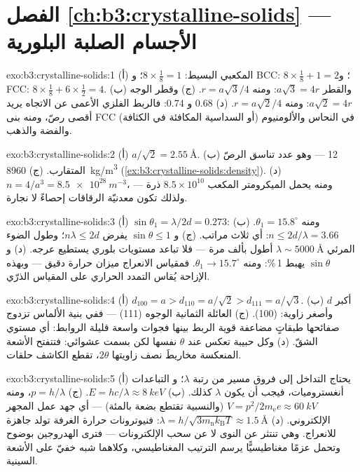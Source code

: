 \section*{الفصل \ref{ch:b3:crystalline-solids} --- الأجسام الصلبة البلورية}

\begin{solution}{exo:b3:crystalline-solids:1}
(أ) المكعبي البسيط: $8\times\tfrac18 = 1$؛ و BCC: $8\times\tfrac18 + 1 = 2$؛
و FCC: $8\times\tfrac18 + 6\times\tfrac12 = 4$. (ب) والقطر
$a\sqrt3 = 4r$: ومنه $r = a\sqrt3/4$. (ج) وقطر الوجه $a\sqrt2 = 4r$:
ومنه $r = a\sqrt2/4$. (د) $0.68$ و $0.74$: فالربط الفلزي
الأعمى عن الاتجاه يريد أقصى رصّ، ومنه بنى FCC (أو السداسية
المكافئة في الكثافة) في النحاس والألومنيوم والفضة والذهب.
\end{solution}

\begin{solution}{exo:b3:crystalline-solids:2}
(أ) $a/\sqrt2 = \qty{2.55}{\angstrom}$. (ب) 12 --- وهو عدد تناسق
الرصّ المتقارب. (ج) \qty{8960}{kg/m^3}
(\cref{ex:b3:crystalline-solids:density}). (د) $n = 4/a^3 =
\qty{8.5e28}{m^{-3}}$، ومنه يحمل الميكرومتر المكعب
$8.5\times10^{10}$ ذرة --- ولذلك تكون معدنيّة الرقاقات
إحصاءً لا نجارة.
\end{solution}

\begin{solution}{exo:b3:crystalline-solids:3}
(أ) $\sin\theta_1 = \lambda/2d = 0.273$: ومنه $\theta_1 =
15.8^\circ$. (ب) $n \le 2d/\lambda = 3.66$: أي ثلاث مراتب. (ج)
و $\sin\theta \le 1$ يفرض $n\lambda \le 2d$؛ وطول الضوء المرئي
$\lambda \sim \qty{5000}{\angstrom}$ أطول بألف مرة
--- فلا تباعد مستويات بلوري يستطيع عرجه. (د) و $\sin\theta$
يهبط 1\,\%: ومنه $\theta_1 \to 15.7^\circ$. فمقياس الانعراج ميزان
حرارة دقيق --- وبهذه الإزاحة يُقاس التمدد الحراري
على المقياس الذرّي.
\end{solution}

\begin{solution}{exo:b3:crystalline-solids:4}
(أ) $d_{100} = a > d_{110} = a/\sqrt2 > d_{111} = a/\sqrt3$. (ب)
أكبر $d$ وأصغر زاوية: (100). (ج) العائلة الثمانية الوجوه (111)
--- ففي بنية الألماس تزدوج صفائحها طبقاتٍ مضاعفة قوية
الربط بينها فجوات واسعة قليلة الروابط:
أي مستوي الشقّ. (د) وكل حبيبة تعكس عند $\theta$ نفسها
لكن بسمت عشوائي: فتتفتح الأشعة المنعكسة مخاريطَ
نصف زاويتها $2\theta$، تقطع الكاشف حلقات.
\end{solution}

\begin{solution}{exo:b3:crystalline-solids:5}
(أ) يحتاج التداخل إلى فروق مسير من رتبة $\lambda$؛ و
التباعدات أنغستروميات، فيجب أن يكون $\lambda$ كذلك. (ب) $E =
hc/\lambda \approx \qty{8}{keV}$. (ج) $p = h/\lambda$، ومنه $V =
p^2/2m_{\text{e}}e \approx \qty{60}{kV}$ (والنسبية تقتطع بضعة
بالمئة) --- أي جهد عمل المجهر الإلكتروني. (د)
$\lambda = h/\sqrt{3m_{\text{n}}k_{\text{B}}T} \approx
\qty{1.5}{\angstrom}$: فنيوترونات حرارة الغرفة تولد
جاهزة للانعراج. وهي تنتثر عن النوى لا عن سحب الإلكترونات
--- فترى الهدروجين بوضوح وتحمل عزمًا مغناطيسيًّا
يرسم الترتيب المغناطيسي، وكلاهما شبه خفيّ على الأشعة السينية.
\end{solution}

